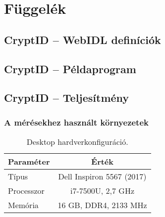 \chapter*{Függelék}

\section*{CryptID – WebIDL definíciók}



\pagebreak

\section*{CryptID – Példaprogram}



\pagebreak

\section*{CryptID – Teljesítmény}

\subsection*{A mérésekhez használt környezetek}

\begin{table}[h!]
\captionsetup{justification=centering}
\centering
  \begin{tabular}{|| l | c ||}
  \hline
  Paraméter & Érték \\
  \hline \hline
  Típus        & Dell Inspiron 5567 (2017) \\
  Processzor   & i7-7500U, 2,7 GHz \\
  Memória      & 16 GB, DDR4, 2133 MHz \\
  \hline
  \end{tabular}
\caption{Desktop hardverkonfiguráció.}  
\label{Fuggelek::Table::BenchmarkDesktopHardware}
\end{table}

